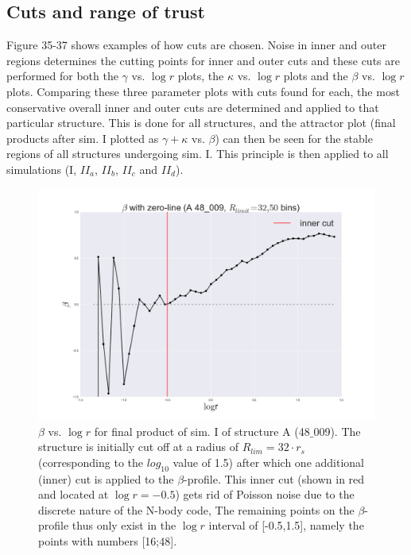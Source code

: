 \subsection{Cuts and range of trust}
Figure 35-37 shows examples of how cuts are chosen.
Noise in inner and outer regions determines the cutting points for inner and outer cuts
and these cuts are performed for both the $\gamma$ vs. $\log r$ plots, the $\kappa$ vs. $\log r$ plots and the $\beta$ vs. $\log r$ plots. Comparing these three parameter plots with cuts found for each,
the most conservative overall inner and outer cuts are determined and applied to that particular structure. This is done for all structures, and the attractor plot (final products after sim. I plotted as $\gamma + \kappa$ vs. $\beta$) can then be seen for the stable regions of all structures undergoing sim. I.
 This principle is then applied to all simulations (I, $II_a$, $II_b$, $II_c$ and $II_d$). 

\begin{figure}[!htbp]
\centering
\includegraphics[width=1.0\linewidth]{img/A_48_009_beta_logr_I_R32_cuts.png}
\caption{$\beta$ vs. $\log r$ for final product of sim. I of structure A (48$\_$009).
The structure is initially cut off at a radius of $R_{lim} = 32\cdot r_s$ (corresponding to the $log_{10}$ value of 1.5) 
after which one additional (inner) cut is applied to the $\beta$-profile.
This inner cut (shown in red and located at $\log r = -0.5$) gets rid of Poisson noise due to the discrete nature of the N-body code, 
The remaining points on the $\beta$-profile thus only exist in the $\log r $ interval of [-0.5,1.5], namely the points with numbers [16;48].}
\label{fig:test}
\end{figure}

